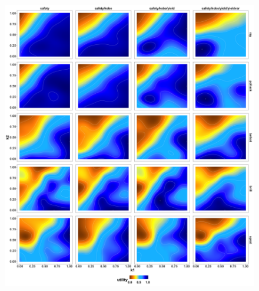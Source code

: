 \documentclass[preprint,12pt]{elsarticle}
\begin{document}
\begin{figure}[]\centering\includegraphics[width=5in]{fig6.png}\caption{}\label{fig:fig6}\end{figure}







\end{document}
